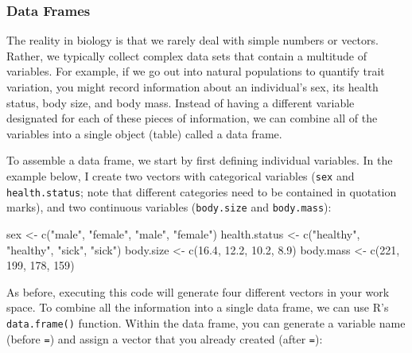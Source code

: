 \documentclass[
]{book}
\newenvironment{Shaded}{\begin{snugshade}}{\end{snugshade}}
\newcommand{\DecValTok}[1]{\textcolor[rgb]{0.00,0.00,0.81}{#1}}
\newcommand{\FloatTok}[1]{\textcolor[rgb]{0.00,0.00,0.81}{#1}}
\newcommand{\FunctionTok}[1]{\textcolor[rgb]{0.00,0.00,0.00}{#1}}
\newcommand{\NormalTok}[1]{#1}
\newcommand{\OtherTok}[1]{\textcolor[rgb]{0.56,0.35,0.01}{#1}}
\newcommand{\StringTok}[1]{\textcolor[rgb]{0.31,0.60,0.02}{#1}}
\begin{document}
\hypertarget{data-frames}{%
\subsubsection*{Data Frames}\label{data-frames}}

The reality in biology is that we rarely deal with simple numbers or vectors. Rather, we typically collect complex data sets that contain a multitude of variables. For example, if we go out into natural populations to quantify trait variation, you might record information about an individual's sex, its health status, body size, and body mass. Instead of having a different variable designated for each of these pieces of information, we can combine all of the variables into a single object (table) called a data frame.

To assemble a data frame, we start by first defining individual variables. In the example below, I create two vectors with categorical variables (\texttt{sex} and \texttt{health.status}; note that different categories need to be contained in quotation marks), and two continuous variables (\texttt{body.size} and \texttt{body.mass}):

\begin{Shaded}
\begin{Highlighting}[]
\NormalTok{sex }\OtherTok{\textless{}{-}} \FunctionTok{c}\NormalTok{(}\StringTok{"male"}\NormalTok{, }\StringTok{"female"}\NormalTok{, }\StringTok{"male"}\NormalTok{, }\StringTok{"female"}\NormalTok{)}
\NormalTok{health.status }\OtherTok{\textless{}{-}} \FunctionTok{c}\NormalTok{(}\StringTok{"healthy"}\NormalTok{, }\StringTok{"healthy"}\NormalTok{, }\StringTok{"sick"}\NormalTok{, }\StringTok{"sick"}\NormalTok{)}
\NormalTok{body.size }\OtherTok{\textless{}{-}} \FunctionTok{c}\NormalTok{(}\FloatTok{16.4}\NormalTok{, }\FloatTok{12.2}\NormalTok{, }\FloatTok{10.2}\NormalTok{, }\FloatTok{8.9}\NormalTok{)}
\NormalTok{body.mass }\OtherTok{\textless{}{-}} \FunctionTok{c}\NormalTok{(}\DecValTok{221}\NormalTok{, }\DecValTok{199}\NormalTok{, }\DecValTok{178}\NormalTok{, }\DecValTok{159}\NormalTok{)}
\end{Highlighting}
\end{Shaded}

As before, executing this code will generate four different vectors in your work space. To combine all the information into a single data frame, we can use R's \texttt{data.frame()} function. Within the data frame, you can generate a variable name (before \texttt{=}) and assign a vector that you already created (after \texttt{=}):
\end{document}
